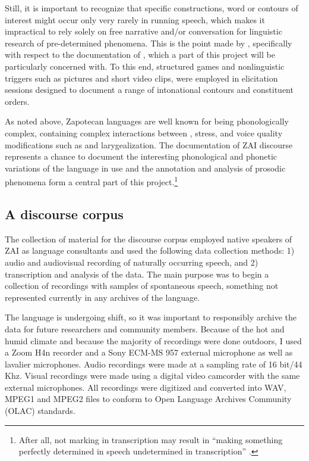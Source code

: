 Still, it is important to recognize that specific constructions, word or  contours of interest might occur only very rarely in running speech, which makes it impractical to rely solely on free narrative and/or conversation for linguistic research of pre-determined phenomena. This is the point made by \citet{himmelmann2006}, specifically with respect to the documentation of , which a part of this project will be particularly concerned with. To this end, structured games and nonlinguistic triggers such as pictures and short video clips, were employed in elicitation sessions designed to document a range of intonational contours and constituent orders.

As noted above, Zapotecan languages are well known for being phonologically complex, containing complex interactions between , stress, and voice quality modifications such as  and larygealization. The documentation of ZAI discourse represents a chance to document the interesting phonological and phonetic variations of the language in use and the annotation and analysis of prosodic phenomena form a central part of this project.\footnote{After all, not marking  in transcription may result in ``making something perfectly determined in speech undetermined in transcription'' \citep[57]{scarano2009}.}  



\subsection{A discourse corpus}

The collection of material for the discourse corpus employed native speakers of ZAI as language consultants and used the following data collection methods: 1) audio and audiovisual recording of naturally occurring speech, and 2) transcription and analysis of the data. The main purpose was to begin a collection of recordings with samples of spontaneous speech, something not represented currently in any archives of the language. 

The language is undergoing shift, so it was important to responsibly archive the data for future researchers and community members. Because of the hot and humid climate and because the majority of recordings were done outdoors, I used a Zoom H4n recorder and a Sony ECM-MS 957 external microphone as well as lavalier microphones. Audio recordings were made at a sampling rate of 16 bit/44 Khz. Visual recordings were made using a digital video camcorder with the same external microphones. All recordings were digitized and converted into WAV, MPEG1 and MPEG2 files to conform to Open Language Archives Community (OLAC) standards. 

